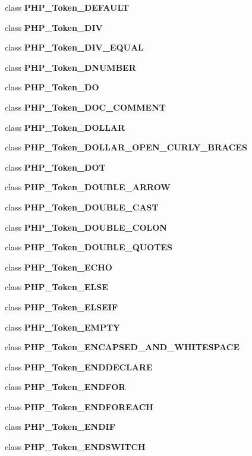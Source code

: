 \begin{DoxyCompactItemize}
class {\bf P\+H\+P\+\_\+\+Token\+\_\+\+D\+E\+F\+A\+U\+L\+T}
\item 
class {\bf P\+H\+P\+\_\+\+Token\+\_\+\+D\+I\+V}
\item 
class {\bf P\+H\+P\+\_\+\+Token\+\_\+\+D\+I\+V\+\_\+\+E\+Q\+U\+A\+L}
\item 
class {\bf P\+H\+P\+\_\+\+Token\+\_\+\+D\+N\+U\+M\+B\+E\+R}
\item 
class {\bf P\+H\+P\+\_\+\+Token\+\_\+\+D\+O}
\item 
class {\bf P\+H\+P\+\_\+\+Token\+\_\+\+D\+O\+C\+\_\+\+C\+O\+M\+M\+E\+N\+T}
\item 
class {\bf P\+H\+P\+\_\+\+Token\+\_\+\+D\+O\+L\+L\+A\+R}
\item 
class {\bf P\+H\+P\+\_\+\+Token\+\_\+\+D\+O\+L\+L\+A\+R\+\_\+\+O\+P\+E\+N\+\_\+\+C\+U\+R\+L\+Y\+\_\+\+B\+R\+A\+C\+E\+S}
\item 
class {\bf P\+H\+P\+\_\+\+Token\+\_\+\+D\+O\+T}
\item 
class {\bf P\+H\+P\+\_\+\+Token\+\_\+\+D\+O\+U\+B\+L\+E\+\_\+\+A\+R\+R\+O\+W}
\item 
class {\bf P\+H\+P\+\_\+\+Token\+\_\+\+D\+O\+U\+B\+L\+E\+\_\+\+C\+A\+S\+T}
\item 
class {\bf P\+H\+P\+\_\+\+Token\+\_\+\+D\+O\+U\+B\+L\+E\+\_\+\+C\+O\+L\+O\+N}
\item 
class {\bf P\+H\+P\+\_\+\+Token\+\_\+\+D\+O\+U\+B\+L\+E\+\_\+\+Q\+U\+O\+T\+E\+S}
\item 
class {\bf P\+H\+P\+\_\+\+Token\+\_\+\+E\+C\+H\+O}
\item 
class {\bf P\+H\+P\+\_\+\+Token\+\_\+\+E\+L\+S\+E}
\item 
class {\bf P\+H\+P\+\_\+\+Token\+\_\+\+E\+L\+S\+E\+I\+F}
\item 
class {\bf P\+H\+P\+\_\+\+Token\+\_\+\+E\+M\+P\+T\+Y}
\item 
class {\bf P\+H\+P\+\_\+\+Token\+\_\+\+E\+N\+C\+A\+P\+S\+E\+D\+\_\+\+A\+N\+D\+\_\+\+W\+H\+I\+T\+E\+S\+P\+A\+C\+E}
\item 
class {\bf P\+H\+P\+\_\+\+Token\+\_\+\+E\+N\+D\+D\+E\+C\+L\+A\+R\+E}
\item 
class {\bf P\+H\+P\+\_\+\+Token\+\_\+\+E\+N\+D\+F\+O\+R}
\item 
class {\bf P\+H\+P\+\_\+\+Token\+\_\+\+E\+N\+D\+F\+O\+R\+E\+A\+C\+H}
\item 
class {\bf P\+H\+P\+\_\+\+Token\+\_\+\+E\+N\+D\+I\+F}
\item 
class {\bf P\+H\+P\+\_\+\+Token\+\_\+\+E\+N\+D\+S\+W\+I\+T\+C\+H}
\item 

\end{DoxyCompactItemize}
